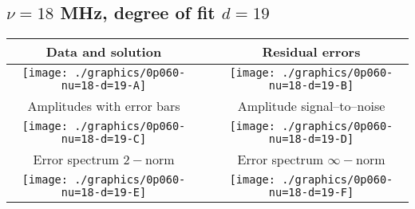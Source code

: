 

% 

\clearpage{}
\break{}

\subsection{$\nu = 18$ MHz, degree of fit $d = 19$}

\begin{table}[h]
    \begin{center}
        \begin{tabular}{ccc}
            Data and solution & \quad & Residual errors \\\hline
            \texttt{[image: ./graphics/0p060-nu=18-d=19-A]} &&
            \texttt{[image: ./graphics/0p060-nu=18-d=19-B]} \\[15pt]
            Amplitudes with error bars && Amplitude signal--to--noise \\\hline
            \texttt{[image: ./graphics/0p060-nu=18-d=19-C]} &&
            \texttt{[image: ./graphics/0p060-nu=18-d=19-D]} \\[15pt]
            Error spectrum $2-$norm && Error spectrum $\infty-$norm \\\hline
            \texttt{[image: ./graphics/0p060-nu=18-d=19-E]} &&
            \texttt{[image: ./graphics/0p060-nu=18-d=19-F]} \\[15pt]
        \end{tabular}
    \end{center}
\label{fig:elev=60, nu=18}
\end{table}



\endinput
